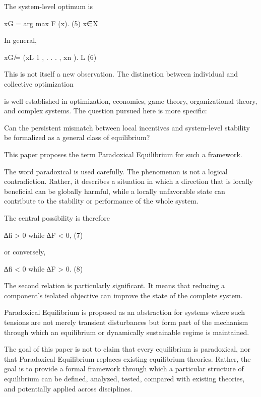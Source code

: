 \documentclass[10pt,a4paper]{article}
\begin{document}
\begin{ManuscriptText}
The system-level optimum is


                                        xG = arg max F (x).                                      (5)
                                                       x∈X

In general,


                                         xG ̸= (xL
                                                 1 , . . . , xn ).
                                                              L
                                                                                                 (6)

This is not itself a new observation. The distinction between individual and collective optimization


is well established in optimization, economics, game theory, organizational theory, and complex
systems. The question pursued here is more specific:

      Can the persistent mismatch between local incentives and system-level stability be
      formalized as a general class of equilibrium?

This paper proposes the term Paradoxical Equilibrium for such a framework.

The word paradoxical is used carefully. The phenomenon is not a logical contradiction. Rather,
it describes a situation in which a direction that is locally beneficial can be globally harmful,
while a locally unfavorable state can contribute to the stability or performance of the whole
system.

The central possibility is therefore


                                   ∆fi > 0    while         ∆F < 0,                            (7)

or conversely,


                                   ∆fi < 0    while         ∆F > 0.                            (8)

The second relation is particularly significant. It means that reducing a component’s isolated
objective can improve the state of the complete system.

Paradoxical Equilibrium is proposed as an abstraction for systems where such tensions are not
merely transient disturbances but form part of the mechanism through which an equilibrium or
dynamically sustainable regime is maintained.

The goal of this paper is not to claim that every equilibrium is paradoxical, nor that Paradoxical
Equilibrium replaces existing equilibrium theories. Rather, the goal is to provide a formal
framework through which a particular structure of equilibrium can be defined, analyzed, tested,
compared with existing theories, and potentially applied across disciplines.



\end{ManuscriptText}
\end{document}

